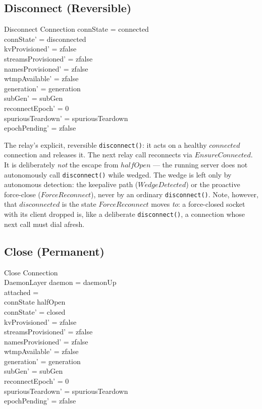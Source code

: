 \documentclass[a4paper,10pt,fleqn]{article}
\begin{document}
\subsection{Disconnect (Reversible)}

\begin{schema}{Disconnect}
  \Delta Connection
  \where
  connState = connected \\
  connState' = disconnected \\
  kvProvisioned' = zfalse \\
  streamsProvisioned' = zfalse \\
  namesProvisioned' = zfalse \\
  wtmpAvailable' = zfalse \\
  generation' = generation \\
  subGen' = subGen \\
  reconnectEpoch' = 0 \\
  spuriousTeardown' = spuriousTeardown \\
  epochPending' = zfalse
\end{schema}

The relay's explicit, reversible \texttt{disconnect()}: it acts
on a healthy $connected$ connection and releases it.  The next
relay call reconnects via $EnsureConnected$.  It is deliberately
\emph{not} the escape from $halfOpen$ --- the running server does
not autonomously call \texttt{disconnect()} while wedged.  The
wedge is left only by autonomous detection: the keepalive path
($WedgeDetected$) or the proactive force-close ($ForceReconnect$),
never by an ordinary \texttt{disconnect()}.  Note, however, that
$disconnected$ is the state $ForceReconnect$ moves \emph{to}: a
force-closed socket with its client dropped is, like a deliberate
\texttt{disconnect()}, a connection whose next call must dial
afresh.

\subsection{Close (Permanent)}

\begin{schema}{Close}
  \Delta Connection \\
  \Xi DaemonLayer
  \where
  daemon = daemonUp \\
  attached = \emptyset \\
  connState \neq halfOpen \\
  connState' = closed \\
  kvProvisioned' = zfalse \\
  streamsProvisioned' = zfalse \\
  namesProvisioned' = zfalse \\
  wtmpAvailable' = zfalse \\
  generation' = generation \\
  subGen' = subGen \\
  reconnectEpoch' = 0 \\
  spuriousTeardown' = spuriousTeardown \\
  epochPending' = zfalse
\end{schema}
\end{document}

